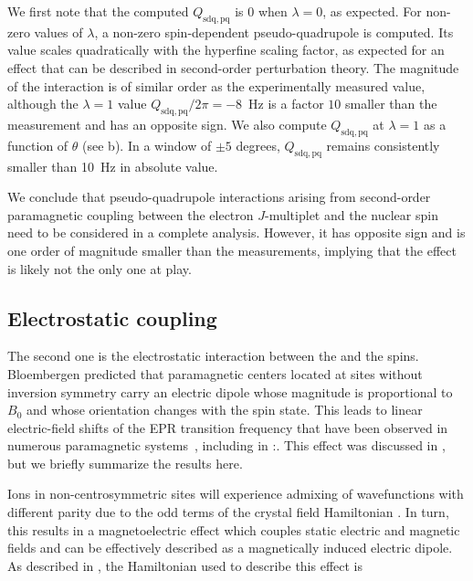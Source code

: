 We first note that the computed $Q_\mathrm{sdq, pq}$ is $0$ when $\lambda=0$, as expected. For non-zero values of $\lambda$, a non-zero spin-dependent pseudo-quadrupole is computed. Its value scales quadratically with the hyperfine scaling factor, as expected for an effect that can be described in second-order perturbation theory. The magnitude of the interaction is of similar order as the experimentally measured value, although the $\lambda=1$ value $Q_\mathrm{sdq, pq}/2\pi =-8$~Hz is a factor $10$ smaller than the measurement and has an opposite sign. We also compute $Q_\mathrm{sdq, pq}$ at $\lambda=1$ as a function of $\theta$ (see b). In a window of $\pm5$ degrees, $Q_\mathrm{sdq, pq}$ remains consistently smaller than 10~Hz in absolute value.

We conclude that pseudo-quadrupole interactions arising from second-order paramagnetic coupling between the electron $J$-multiplet and the nuclear spin need to be considered in a complete analysis. However, it has opposite sign and is one order of magnitude smaller than the measurements, implying that the effect is likely not the only one at play.

\subsection{Electrostatic coupling}

The second one is the electrostatic interaction between the \Er and the \Nb spins. Bloembergen predicted  that paramagnetic centers located at sites without inversion symmetry carry an electric dipole whose magnitude is proportional to $B_0$ and whose orientation changes with the spin state. This leads to linear electric-field shifts of the EPR transition frequency that have been observed in numerous paramagnetic systems~, including in \Er:\Ca {}. This effect was discussed in , but we briefly summarize the results here. 

Ions in non-centrosymmetric sites will experience admixing of wavefunctions with different parity due to the odd terms of the crystal field Hamiltonian . In turn, this results in a magnetoelectric effect which couples static electric and magnetic fields and can be effectively described as a magnetically induced electric dipole. As described in , the Hamiltonian used to describe this effect is 


